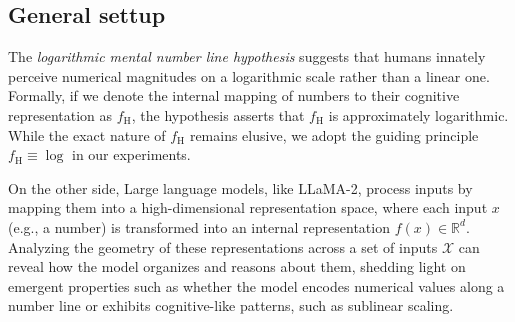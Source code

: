 


\subsection{General settup} 

The \textit{logarithmic mental number line hypothesis} \cite{dehaene2008log} suggests that humans innately perceive numerical magnitudes on a logarithmic scale rather than a linear one. Formally, if we denote the internal mapping of numbers to their cognitive representation as \( f_{\text{H}} \), the hypothesis asserts that \( f_{\text{H}} \) is approximately logarithmic. While the exact nature of \( f_{\text{H}} \) remains elusive, we adopt the guiding principle \( f_{\text{H}} \equiv \log \) in our experiments.

On the other side, Large language models, like LLaMA-2, process inputs by mapping them into a high-dimensional representation space, where each input \( x \) (e.g., a number) is transformed into an internal representation \( f(x) \in \mathbb{R}^d \). Analyzing the geometry of these representations across a set of inputs \( \mathcal{X} \) can reveal how the model organizes and reasons about them, shedding light on emergent properties such as whether the model encodes numerical values along a number line or exhibits cognitive-like patterns, such as sublinear scaling. 

